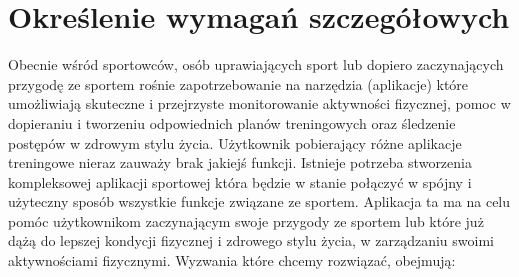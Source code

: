\newpage
\section{Określenie wymagań szczegółowych}		%

Obecnie wśród sportowców, osób uprawiających sport lub dopiero zaczynających przygodę ze sportem rośnie zapotrzebowanie na narzędzia (aplikacje) które umożliwiają skuteczne i przejrzyste monitorowanie aktywności fizycznej, pomoc w dopieraniu i tworzeniu odpowiednich planów treningowych oraz śledzenie postępów w zdrowym stylu życia. Użytkownik pobierający różne aplikacje treningowe nieraz zauważy brak jakiejś funkcji. Istnieje potrzeba stworzenia kompleksowej aplikacji sportowej która będzie w stanie połączyć w spójny i użyteczny sposób wszystkie funkcje związane ze sportem. Aplikacja ta ma na celu pomóc użytkownikom zaczynającym swoje przygody ze sportem lub które już dążą do lepszej kondycji fizycznej i zdrowego stylu życia, w zarządzaniu swoimi aktywnościami fizycznymi. Wyzwania które chcemy rozwiązać, obejmują:

